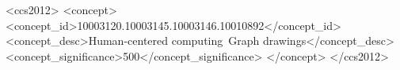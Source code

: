 \documentclass[sigplan,10pt]{acmart}\settopmatter{printfolios=true}
\begin{document}


\begin{abstract}
\paperAbstract
\end{abstract}


\begin{CCSXML}
<ccs2012>
<concept>
<concept_id>10003120.10003145.10003146.10010892</concept_id>
<concept_desc>Human-centered computing~Graph drawings</concept_desc>
<concept_significance>500</concept_significance>
</concept>
</ccs2012>
\end{CCSXML}





\maketitle

\end{document}
